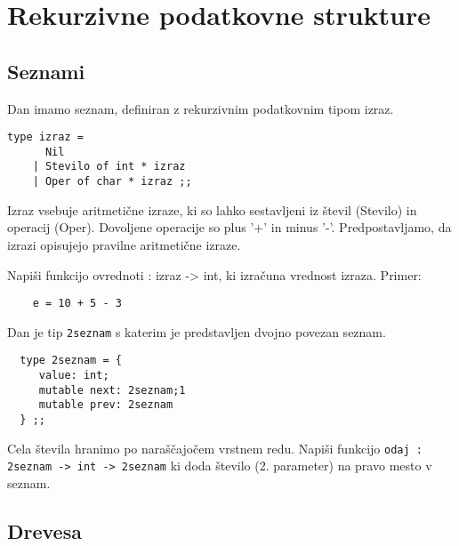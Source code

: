 
\section{Rekurzivne podatkovne strukture}

\subsection{Seznami}
\begin{ex}
Dan imamo seznam, definiran z rekurzivnim podatkovnim tipom izraz. 
\begin{lstlisting}
type izraz = 
      Nil 
    | Stevilo of int * izraz 
    | Oper of char * izraz ;; 
\end{lstlisting}
Izraz vsebuje aritmeti\v cne izraze, ki so lahko sestavljeni iz \v stevil (Stevilo) in operacij (Oper). Dovoljene operacije so plus '+' in minus '-'. Predpostavljamo, da izrazi opisujejo pravilne aritmeti\v cne izraze.

Napi\v si funkcijo ovrednoti : izraz -> int, ki izra\v cuna vrednost izraza.
Primer: 
\begin{lstlisting} 
    e = 10 + 5 - 3
\end{lstlisting}

\end{ex}
\begin{ex}
  Dan je tip \lstinline{2seznam} s katerim je predstavljen dvojno povezan
  seznam.

  \begin{lstlisting}
  type 2seznam = {
     value: int;
     mutable next: 2seznam;1
     mutable prev: 2seznam
  } ;;
  \end{lstlisting}

  Cela \v stevila hranimo po nara\v s\v cajo\v cem vrstnem
  redu. Napi\v si funkcijo \lstinline{odaj : 2seznam -> int -> 2seznam}
  ki doda \v stevilo (2. parameter) na pravo mesto v seznam.


\end{ex} 

\subsection{Drevesa}

